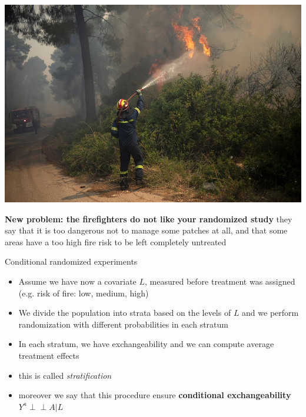 \documentclass{beamer}
\newcommand{\indep}{\perp \!\!\! \perp}
\begin{document}
\begin{frame}
	\includegraphics[scale=0.2]{fire}

	\textbf{New problem: the firefighters do not like your randomized study}
	they say that it is too dangerous not to manage some patches at all, and that some
	areas have a too high fire risk to be left completely untreated
\end{frame}

\begin{frame}{Conditional randomized experiments}
  \begin{itemize}
    \item<1-> Assume we have now a covariate $L$, measured before treatment was assigned
      (e.g. risk of fire: low, medium, high)
    \item<2-> We divide the population into strata based on the levels of $L$
      and we perform randomization with different probabilities in each stratum
    \item<3-> In each stratum, we have exchangeability and we can compute
      average treatment effects
    \item<4-> this is called \emph{stratification}
    \item<5-> moreover we say that this procedure ensure \textbf{conditional exchangeability}                          $Y^a \indep A | L$
  \end{itemize}
\end{frame}
\end{document}
